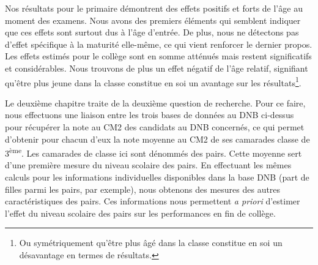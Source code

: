 \documentclass[
]{book}
\begin{document}
Nos résultats pour le primaire démontrent des effets positifs et forts de l'âge au moment des examens. Nous avons des premiers éléments qui semblent indiquer que ces effets sont surtout dus à l'âge d'entrée. De plus, nous ne détectons pas d'effet spécifique à la maturité elle-même, ce qui vient renforcer le dernier propos. Les effets estimés pour le collège sont en somme atténués mais restent significatifs et considérables. Nous trouvons de plus un effet négatif de l'âge relatif, signifiant qu'être plus jeune dans la classe constitue en soi un avantage sur les résultats\footnote{Ou symétriquement qu'être plus âgé dans la classe constitue en soi un désavantage en termes de résultats.}.

\quad Le deuxième chapitre traite de la deuxième question de recherche. Pour ce faire, nous effectuons une liaison entre les trois bases de données au DNB ci-dessus pour récupérer la note au CM2 des candidats au DNB concernés, ce qui permet d'obtenir pour chacun d'eux la note moyenne au CM2 de ses camarades classe de 3\textsuperscript{ème}. Les camarades de classe ici sont dénommés des pairs. Cette moyenne sert d'une première mesure du niveau scolaire des pairs. En effectuant les mêmes calculs pour les informations individuelles disponibles dans la base DNB (part de filles parmi les pairs, par exemple), nous obtenons des mesures des autres caractéristiques des pairs. Ces informations nous permettent \emph{a priori} d'estimer l'effet du niveau scolaire des pairs sur les performances en fin de collège.
\end{document}
